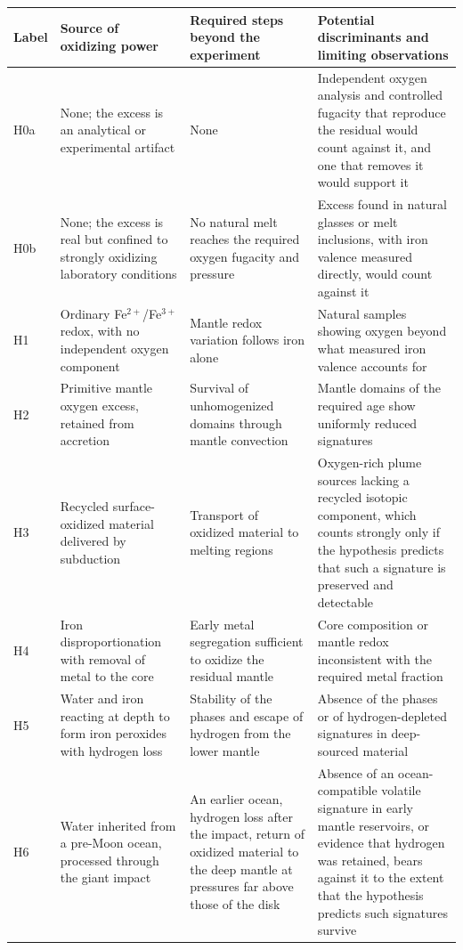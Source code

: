 \documentclass[11pt]{article}
\begin{document}
\begin{table}[h]
\centering
\small
\begin{tabularx}{\textwidth}{@{}l Y Y Y@{}}
\toprule
Label & Source of oxidizing power & Required steps beyond the experiment & Potential discriminants and limiting observations \\
\midrule
H0a & None; the excess is an analytical or experimental artifact & None & Independent oxygen analysis and controlled fugacity that reproduce the residual would count against it, and one that removes it would support it \\[3pt]
H0b & None; the excess is real but confined to strongly oxidizing laboratory conditions & No natural melt reaches the required oxygen fugacity and pressure & Excess found in natural glasses or melt inclusions, with iron valence measured directly, would count against it \\[3pt]
H1 & Ordinary Fe$^{2+}$/Fe$^{3+}$ redox, with no independent oxygen component & Mantle redox variation follows iron alone & Natural samples showing oxygen beyond what measured iron valence accounts for \\[3pt]
H2 & Primitive mantle oxygen excess, retained from accretion \cite{andrault2018} & Survival of unhomogenized domains through mantle convection & Mantle domains of the required age show uniformly reduced signatures \\[3pt]
H3 & Recycled surface-oxidized material delivered by subduction & Transport of oxidized material to melting regions & Oxygen-rich plume sources lacking a recycled isotopic component, which counts strongly only if the hypothesis predicts that such a signature is preserved and detectable \\[3pt]
H4 & Iron disproportionation with removal of metal to the core \cite{frost2008} & Early metal segregation sufficient to oxidize the residual mantle & Core composition or mantle redox inconsistent with the required metal fraction \\[3pt]
H5 & Water and iron reacting at depth to form iron peroxides with hydrogen loss \cite{hu2016} & Stability of the phases and escape of hydrogen from the lower mantle & Absence of the phases or of hydrogen-depleted signatures in deep-sourced material \\[3pt]
H6 & Water inherited from a pre-Moon ocean, processed through the giant impact & An earlier ocean, hydrogen loss after the impact, return of oxidized material to the deep mantle at pressures far above those of the disk & Absence of an ocean-compatible volatile signature in early mantle reservoirs, or evidence that hydrogen was retained, bears against it to the extent that the hypothesis predicts such signatures survive \\[3pt]

\end{tabularx}
\end{table}
\end{document}
